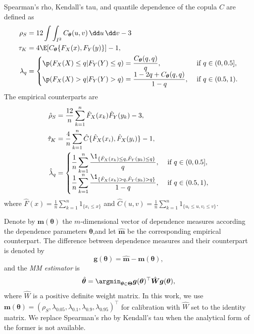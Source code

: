 Spearman's rho, Kendall's tau, and quantile dependence of the copula $C$ are defined as
\begin{align*}
  \rho_S &= 12 \int\int_{I^2} C_{\bm{\theta}}(u,v)\, \dd u\, \dd v-3\label{eq:rho_S}\\
  \tau_K &= 4\E[C_{\bm{\theta}}\{F_X(x), F_Y(y)\}]-1,\\
  \lambda_q &=
  \begin{cases}
    \p(F_X(X)\leq q| F_Y(Y)\leq q) = \displaystyle \frac{C_{\bm{\theta}}(q,q)}{q},
    &\text{ if } q\in (0,0.5],\\
    \p(F_X(X)>q|F_Y(Y)>q) =\displaystyle \frac{1-2q+C_{\bm{\theta}}(q,q)} {1-q},
    &\text{ if } q\in (0.5,1).
  \end{cases}
\end{align*}
The empirical counterparts are
\begin{align*}
  \hat\rho_S &= \frac{12}{n} \sum_{k=1}^n \hat F_X(x_k) \hat F_Y(y_k)
               -3,\\
  \hat\tau_K &= \frac{4}{n}\sum_{k=1}^n \hat{C}\{\hat{F}_X(x_i),\hat{F}_X(y_i)\} -1 ,\\
  \hat\lambda_q &=
                  \begin{cases}
                    \displaystyle\frac{1}{n} \sum_{k=1}^n \frac{\1_{\{\hat
                        F_X(x_k)\leq q, \hat F_Y(y_k)\leq q\}}} {q},
                    &\text { if } q\in (0, 0.5],\\
                    \displaystyle \frac{1}{n} \sum_{k=1}^n
                    \frac{\1_{\{\hat F_X(x_k)>q, \hat F_Y(y_k)>q\}}}
                    {1-q}, &\text { if } q\in (0.5,1),
                  \end{cases}
\end{align*}
where $\displaystyle \hat{F}(x) =
  \frac{1}{n}\sum_{k=1}^n 1_{\{x_i\leq x\}}$ and
$\displaystyle \hat{C}(u,v) = \frac{1}{n}\sum_{k=1}^n 1_{\{u_i\leq u, v_i\leq v\}}$. 

Denote by $\bm{m}(\bm{\theta})$ the $m$-dimensional vector of
dependence measures according the dependence parameters
$\bm{\theta}$,and let $\hat{\bm{m}}$ be the corresponding empirical
counterpart. 
The difference between dependence measures and their counterpart is denoted by
\begin{equation*}
    \bm{g}(\bm{\theta}) = \hat{\bm{m}} - \bm{m}(\bm{\theta}),
\end{equation*}
and the {\em MM estimator} is
\begin{equation*}
    \hat{\bm{\theta}} = \argmin_{\bm{\theta}\in \bm{\Theta}} \bm{g}(\bm{\theta})^\top
    \hat{\bm{W}}
     \bm{g}(\bm{\theta}),
\end{equation*}
where $\hat{W}$ is a positive definite weight matrix.
In this work, we use
$\bm{m}(\bm{\theta}) = (\rho_S, \lambda_{0.05}, \lambda_{0.1}, 
\lambda_{0.9}, \lambda_{0.95})^\top$
for calibration with 
$\hat{W}$ set to the identity matrix. 
We replace Spearman's rho by Kendall's tau when the analytical form of the former is not available. 

